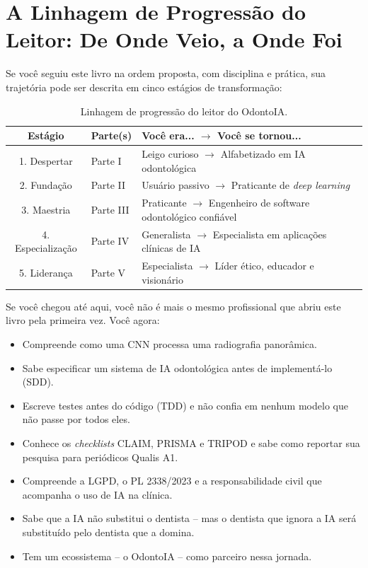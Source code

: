 \section{A Linhagem de Progressão do Leitor: De Onde Veio, a Onde Foi}
\label{sec:linhagem}

\niveldois

Se você seguiu este livro na ordem proposta, com disciplina e prática, sua
trajetória pode ser descrita em cinco estágios de transformação:

\begin{table}[H]
  \centering
  \caption{Linhagem de progressão do leitor do OdontoIA.}
  \label{tab:linhagem-leitor}
  \begin{tabularx}{\textwidth}{clX}
    \toprule
    \textbf{Estágio} & \textbf{Parte(s)} & \textbf{Você era... $\rightarrow$ Você se tornou...} \\
    \midrule
    1. Despertar & Parte I & Leigo curioso $\rightarrow$ Alfabetizado em IA
      odontológica \\
    2. Fundação & Parte II & Usuário passivo $\rightarrow$ Praticante de
      \textit{deep learning} \\
    3. Maestria & Parte III & Praticante $\rightarrow$ Engenheiro de software
      odontológico confiável \\
    4. Especialização & Parte IV & Generalista $\rightarrow$ Especialista em
      aplicações clínicas de IA \\
    5. Liderança & Parte V & Especialista $\rightarrow$ Líder ético, educador
      e visionário \\
    \bottomrule
  \end{tabularx}
\end{table}

Se você chegou até aqui, você não é mais o mesmo profissional que abriu este
livro pela primeira vez. Você agora:

\begin{itemize}
  \item Compreende como uma CNN processa uma radiografia panorâmica.
  \item Sabe especificar um sistema de IA odontológica antes de implementá-lo
    (SDD).
  \item Escreve testes antes do código (TDD) e não confia em nenhum modelo que
    não passe por todos eles.
  \item Conhece os \textit{checklists} CLAIM, PRISMA e TRIPOD e sabe como
    reportar sua pesquisa para periódicos Qualis A1.
  \item Compreende a LGPD, o PL 2338/2023 e a responsabilidade civil que
    acompanha o uso de IA na clínica.
  \item Sabe que a IA não substitui o dentista -- mas o dentista que ignora a
    IA será substituído pelo dentista que a domina.
  \item Tem um ecossistema -- o OdontoIA -- como parceiro nessa jornada.
\end{itemize}


